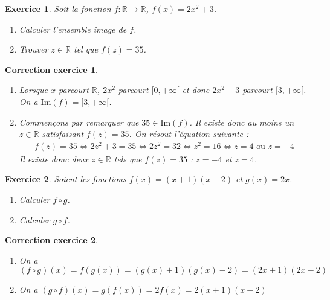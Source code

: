 \documentclass[12pt]{article}
\newtheorem{exercice}{\bf Exercice}
\newtheorem{correction}{\bf Correction exercice}
\newenvironment{exo}{
\begin{exercice}\smallskip\normalfont}{\end{exercice}
}
\newenvironment{cor}{
\begin{correction}\smallskip\normalfont}{\end{correction}
}
\newcommand*{\R}{\mathbb{R}}
\newif\ifcorrige\corrigetrue
\begin{document}

\begin{exo} Soit la fonction $f : \R \to \R$, $f(x) = 2x^2+3$.
\begin{multicols}{2}
\begin{enumerate}
\item Calculer l'ensemble image de $f$.
\item Trouver $z\in\R$ tel que $f(z) = 35$.
\end{enumerate}
\end{multicols}
\end{exo}

\ifcorrige
\color{magenta}
\begin{cor}
  $\qquad$
\begin{enumerate}
\item Lorsque $x$ parcourt $\R$, $2x^2$ parcourt $[0,+\infty[$ et donc $2x^2+3$ parcourt $[3,+\infty[$.
  On a $\text{Im}(f) = [3,+\infty[$.
\item Commen\c{c}ons par remarquer que $35 \in \text{Im}(f)$.
  Il existe donc au moins un $z \in \R$ satisfaisant $f(z) = 35$.
  On r\'esout l'\'equation suivante :
  \begin{align*}
    f(z) = 35
    \iff
    2z^2+3 = 35
    \iff
    2z^2 = 32
    \iff
    z^2 = 16
    \iff
    z = 4 \text{  ou  } z = -4
  \end{align*}
  Il existe donc deux $z \in \R$ tels que $f(z) = 35$ :
  $z=-4$ et $z=4$.
\end{enumerate}
\end{cor}
\color{black}
\fi


\begin{exo} Soient les fonctions $f(x) = (x+1)(x-2)$
  et $g(x) = 2x$.
\begin{multicols}{2}
\begin{enumerate}
\item Calculer $f \circ g$.
\item Calculer $g \circ f$.
\end{enumerate}
\end{multicols}
\end{exo}

\ifcorrige
\color{magenta}
\begin{cor}
  $\qquad$
\begin{enumerate}
\item On a
    $(f \circ g) (x) = f(g(x)) = (g(x)+1)(g(x)-2) = (2x+1)(2x-2)$
\item On a
    $(g \circ f) (x) = g(f(x)) = 2 f(x) = 2(x+1)(x-2)$
\end{enumerate}
\end{cor}
\color{black}
\fi
\end{document}

